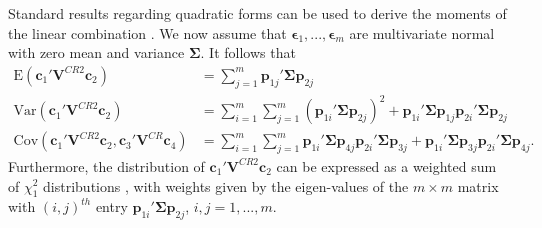 \documentclass[12pt]{article}
\newcommand{\E}{\text{E}}
\newcommand{\Cov}{\text{Cov}}
\newcommand{\Var}{\text{Var}}
\newcommand{\bm}{\mathbf}
\newcommand{\bs}{\boldsymbol}
\begin{document}
Standard results regarding quadratic forms can be used to derive the moments of the linear combination \citep[e.g.,][Sec. 13.5]{Searle2006matrix}. We now assume that $\bs\epsilon_1,...,\bs\epsilon_m$ are multivariate normal with zero mean and variance $\bs\Sigma$. It follows that 
\begin{align}
\label{eq:CRVE_expectation}
\E\left(\bm{c}_1' \bm{V}^{CR2} \bm{c}_2\right) &= \sum_{j=1}^m \bm{p}_{1j}' \bs\Sigma \bm{p}_{2j} \\
\label{eq:CRVE_variance}
\Var\left(\bm{c}_1' \bm{V}^{CR2} \bm{c}_2\right) &= \sum_{i=1}^m \sum_{j=1}^m \left(\bm{p}_{1i}' \bs\Sigma \bm{p}_{2j}\right)^2 + \bm{p}_{1i}' \bs\Sigma \bm{p}_{1j} \bm{p}_{2i}' \bs\Sigma \bm{p}_{2j} \\
\label{eq:CRVE_covariance}
\Cov\left(\bm{c}_1' \bm{V}^{CR2} \bm{c}_2, \bm{c}_3' \bm{V}^{CR} \bm{c}_4\right) &= \sum_{i=1}^m \sum_{j=1}^m \bm{p}_{1i}' \bs\Sigma \bm{p}_{4j} \bm{p}_{2i}' \bs\Sigma \bm{p}_{3j} + \bm{p}_{1i}' \bs\Sigma \bm{p}_{3j} \bm{p}_{2i}' \bs\Sigma \bm{p}_{4j}.
\end{align}
Furthermore, the distribution of $\bm{c}_1' \bm{V}^{CR2} \bm{c}_2$ can be expressed as a weighted sum of $\chi^2_1$ distributions \citep{mathai1992quadratic}, with weights given by the eigen-values of the $m \times m$ matrix with $\left(i,j\right)^{th}$ entry $\bm{p}_{1i}' \bs\Sigma \bm{p}_{2j}$, $i,j=1,...,m$.



\end{document}
